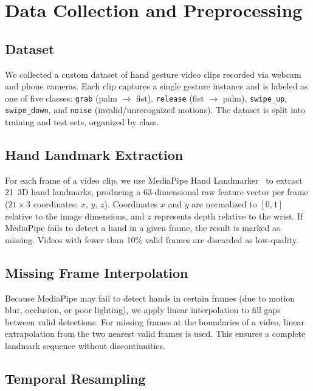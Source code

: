 \section{Data Collection and Preprocessing}
\label{sec:data}

\subsection{Dataset}

We collected a custom dataset of hand gesture video clips recorded via
webcam and phone cameras. Each clip captures a single gesture instance
and is labeled as one of five classes: \texttt{grab} (palm $\to$ fist),
\texttt{release} (fist $\to$ palm), \texttt{swipe\_up},
\texttt{swipe\_down}, and \texttt{noise} (invalid/unrecognized motions).
The dataset is split into training and test sets, organized by class.

\subsection{Hand Landmark Extraction}

For each frame of a video clip, we use MediaPipe Hand
Landmarker~\cite{zhang2020mediapipe} to extract 21~3D hand landmarks,
producing a 63-dimensional raw feature vector per frame
($21 \times 3$ coordinates: $x$, $y$, $z$). Coordinates $x$ and $y$
are normalized to $[0, 1]$ relative to the image dimensions, and $z$
represents depth relative to the wrist. If MediaPipe fails to detect a
hand in a given frame, the result is marked as missing. Videos with
fewer than 10\% valid frames are discarded as low-quality.

\subsection{Missing Frame Interpolation}

Because MediaPipe may fail to detect hands in certain frames (due to
motion blur, occlusion, or poor lighting), we apply linear interpolation
to fill gaps between valid detections. For missing frames at the
boundaries of a video, linear extrapolation from the two nearest valid
frames is used. This ensures a complete landmark sequence without
discontinuities.

\subsection{Temporal Resampling}

